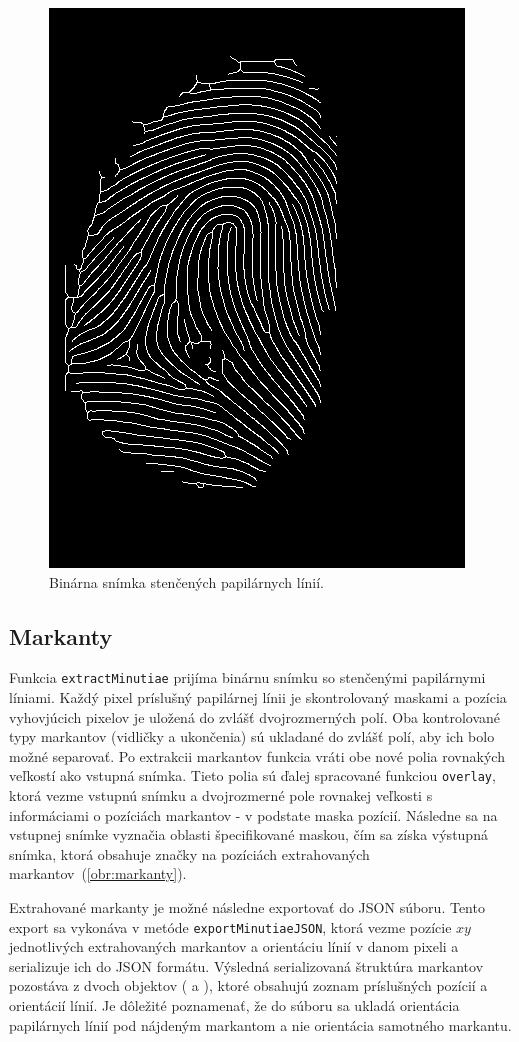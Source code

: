   \begin{figure}[h]
    \centering
    \includegraphics[width=0.3\linewidth]{obrazky-figures/thinned.png}
    \caption{Binárna snímka stenčených papilárnych línií.}
    \label{obr:stencene}
  \end{figure}

  \subsection{Markanty}
  Funkcia \texttt{extractMinutiae} prijíma binárnu snímku so stenčenými papilárnymi líniami. Každý pixel príslušný papilárnej línii je skontrolovaný
  maskami a pozícia vyhovjúcich pixelov je uložená do zvlášť dvojrozmerných polí. Oba kontrolované typy markantov (vidličky a ukončenia) sú ukladané do
  zvlášť polí, aby ich bolo možné separovať. Po extrakcii markantov funkcia vráti obe nové polia rovnakých veľkostí ako vstupná snímka. Tieto polia sú ďalej
  spracované funkciou \texttt{overlay}, ktorá vezme vstupnú snímku a dvojrozmerné pole rovnakej veľkosti s informáciami o pozíciách markantov -
  v podstate maska pozícií. Následne sa na vstupnej snímke vyznačia oblasti špecifikované maskou, čím sa získa výstupná snímka, ktorá obsahuje značky na
  pozíciách extrahovaných markantov~(\ref{obr:markanty}).

  Extrahované markanty je možné následne exportovať do JSON súboru. Tento export sa vykonáva v metóde \texttt{exportMinutiaeJSON}, ktorá vezme pozície
  $xy$ jednotlivých extrahovaných markantov a orientáciu línií v danom pixeli a serializuje ich do JSON formátu. Výsledná serializovaná štruktúra markantov
  pozostáva z dvoch objektov ( a ), ktoré obsahujú zoznam príslušných pozícií a orientácií línií. Je dôležité poznamenať,
  že do súboru sa ukladá orientácia papilárnych línií pod nájdeným markantom a nie orientácia samotného markantu.

